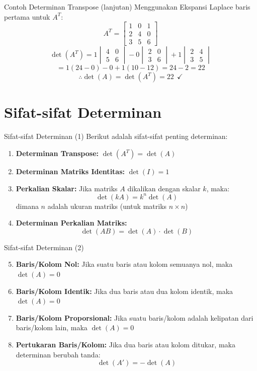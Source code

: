 \documentclass{beamer}
\begin{document}
\begin{frame}[t,fragile]{Contoh Determinan Transpose (lanjutan)}
Menggunakan Ekspansi Laplace baris pertama untuk $A^T$:
$$ A^T = \begin{bmatrix}
       	1 & 0 & 1 \\
	    2 & 4 & 0 \\
	    3 & 5 & 6
        \end{bmatrix} $$
$$ \det(A^T) = 1 \begin{vmatrix} 4 & 0 \\ 5 & 6 \end{vmatrix} - 0 \begin{vmatrix} 2 & 0 \\ 3 & 6 \end{vmatrix} + 1 \begin{vmatrix} 2 & 4 \\ 3 & 5 \end{vmatrix} $$
$$ = 1(24 - 0) - 0 + 1(10 - 12) = 24 - 2 = 22 $$
\vspace{0.3cm}
$$ \therefore \det(A) = \det(A^T) = 22 ~~ \checkmark $$
\end{frame}

\section{Sifat-sifat Determinan}
\begin{frame}[t,fragile]{Sifat-sifat Determinan (1)}
Berikut adalah sifat-sifat penting determinan:
\begin{enumerate}
\item \textbf{Determinan Transpose:} $\det(A^T) = \det(A)$
\item \textbf{Determinan Matriks Identitas:} $\det(I) = 1$
\item \textbf{Perkalian Skalar:} Jika matriks $A$ dikalikan dengan skalar $k$, maka:
$$ \det(kA) = k^n \det(A) $$
dimana $n$ adalah ukuran matriks (untuk matriks $n \times n$)
\item \textbf{Determinan Perkalian Matriks:} 
$$ \det(AB) = \det(A) \cdot \det(B) $$
\end{enumerate}
\end{frame}

\begin{frame}[t,fragile]{Sifat-sifat Determinan (2)}
\begin{enumerate}
\setcounter{enumi}{4}
\item \textbf{Baris/Kolom Nol:} Jika suatu baris atau kolom semuanya nol, maka $\det(A) = 0$
\item \textbf{Baris/Kolom Identik:} Jika dua baris atau dua kolom identik, maka $\det(A) = 0$
\item \textbf{Baris/Kolom Proporsional:} Jika suatu baris/kolom adalah kelipatan dari baris/kolom lain, maka $\det(A) = 0$
\item \textbf{Pertukaran Baris/Kolom:} Jika dua baris atau kolom ditukar, maka determinan berubah tanda:
$$ \det(A') = -\det(A) $$
\end{enumerate}
\end{frame}
\end{document}
